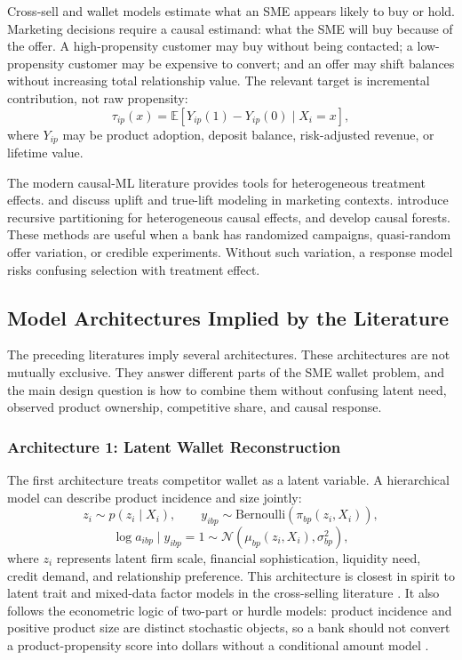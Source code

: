 \documentclass[11pt]{article}
\begin{document}
Cross-sell and wallet models estimate what an SME appears likely to buy or hold.
Marketing decisions require a causal estimand: what the SME will buy because of
the offer. A high-propensity customer may buy without being contacted; a
low-propensity customer may be expensive to convert; and an offer may shift
balances without increasing total relationship value. The relevant target is
incremental contribution, not raw propensity:
\[
  \tau_{ip}(x) =
  \mathbb{E}[Y_{ip}(1)-Y_{ip}(0)\mid X_i=x],
\]
where $Y_{ip}$ may be product adoption, deposit balance, risk-adjusted revenue,
or lifetime value.

The modern causal-ML literature provides tools for heterogeneous treatment
effects. \citet{radcliffe2007uplift} and \citet{lo2002true} discuss uplift and
true-lift modeling in marketing contexts. \citet{athey2016recursive} introduce
recursive partitioning for heterogeneous causal effects, and
\citet{wager2018causalforests} develop causal forests. These methods are useful
when a bank has randomized campaigns, quasi-random offer variation, or credible
experiments. Without such variation, a response model risks confusing selection
with treatment effect.

\subsection{Model Architectures Implied by the Literature}

The preceding literatures imply several architectures. These architectures are
not mutually exclusive. They answer different parts of the SME wallet problem,
and the main design question is how to combine them without confusing latent
need, observed product ownership, competitive share, and causal response.

\subsubsection*{Architecture 1: Latent Wallet Reconstruction}

The first architecture treats competitor wallet as a latent variable. A
hierarchical model can describe product incidence and size jointly:
\[
  z_i \sim p(z_i\mid X_i),
  \qquad
  y_{ibp} \sim \mathrm{Bernoulli}(\pi_{bp}(z_i,X_i)),
\]
\[
  \log a_{ibp}\mid y_{ibp}=1 \sim
  \mathcal{N}(\mu_{bp}(z_i,X_i),\sigma_{bp}^2),
\]
where $z_i$ represents latent firm scale, financial sophistication, liquidity
need, credit demand, and relationship preference. This architecture is closest
in spirit to latent trait and mixed-data factor models in the cross-selling
literature \citep{kamakura1991latent,kamakura2003database}. It also follows
the econometric logic of two-part or hurdle models: product incidence and
positive product size are distinct stochastic objects, so a bank should not
convert a product-propensity score into dollars without a conditional amount
model \citep{cragg1971limited}.
\end{document}
